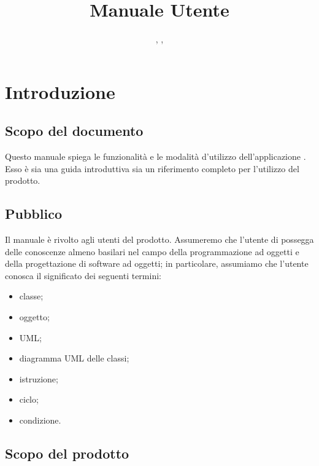 


\author{\LB, \GG, \AZ}
\supervisor{\PB}
\title{Manuale Utente}


\maketitle

\tableofcontents






\section{Introduzione}

\subsection{Scopo del documento}
Questo manuale spiega le funzionalità e le modalità d'utilizzo dell'applicazione \proj. Esso è sia una guida introduttiva sia un riferimento completo per l'utilizzo del prodotto.

\subsection{Pubblico}
Il manuale è rivolto agli utenti del prodotto. Assumeremo che l'utente di \proj{} possegga delle conoscenze almeno basilari nel campo della programmazione ad oggetti e della progettazione di software ad oggetti; in particolare, assumiamo che l'utente conosca il significato dei seguenti termini:
\begin{itemize}
	\item classe;
	\item oggetto;
	\item UML;
	\item diagramma UML delle classi;
	\item istruzione;
	\item ciclo;
	\item condizione.
\end{itemize}

\subsection{Scopo del prodotto}
\scopo

